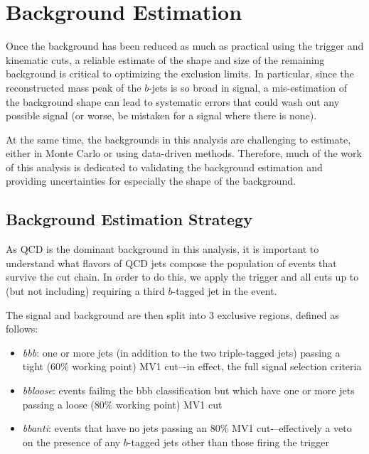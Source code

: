  

\chapter[Background Estimation]{Background Estimation}

Once the background has been reduced as much as practical using the trigger and kinematic cuts,
a reliable estimate of the shape and size of the remaining background is critical to optimizing
the exclusion limits.  In particular, since the reconstructed mass peak of the $b$-jets is so
broad in signal, a mis-estimation of the background shape can lead to systematic errors that
could wash out any possible signal (or worse, be mistaken for a signal where there is none).  

At the same time, the backgrounds in this analysis are challenging to estimate, either in Monte
Carlo or using data-driven methods.  Therefore, much of the work of this analysis is dedicated
to validating the background estimation and providing uncertainties for especially the shape 
of the background.  

\section{Background Estimation Strategy}
\label{sec:background_strategy}
As QCD is the dominant background in this analysis, it is important to understand
what flavors of QCD jets compose the population of events that survive the cut
chain.  In order to do this, we apply the trigger and all cuts up to (but not including)
requiring a third $b$-tagged jet in the event.

 The signal and background are then split into 3 exclusive regions, defined as follows:
\begin{itemize}
    \item \textit{bbb}: one or more jets (in addition to the two triple-tagged jets) passing a tight (60\% working point)
 MV1 cut–-in effect, the full signal selection criteria
    \item \textit{bbloose}: events failing the bbb classification but which have one or more jets passing a loose (80\%
 working point) MV1 cut
    \item \textit{bbanti}: events that have no jets passing an 80\% MV1 cut-–effectively a veto on the presence of any
 $b$-tagged jets other than those firing the trigger
\end{itemize}



